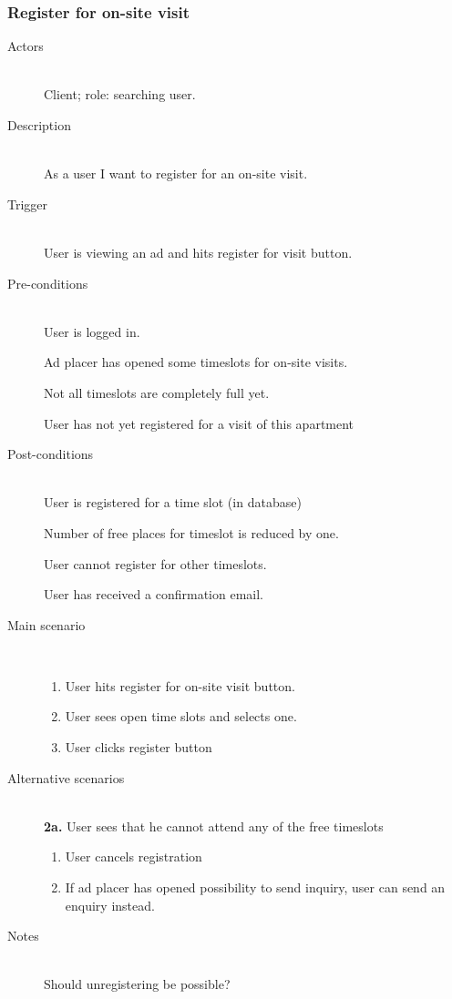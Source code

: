 \documentclass[a4wide]{article}
\begin{document}
\subsubsection{Register for on-site visit}
\begin{description}
\item[Actors]\mbox{}\\
Client; role: searching user.
\item[Description]\mbox{}\\
As a user I want to register for an on-site visit.
\item[Trigger]\mbox{}\\
User is viewing an ad and hits register for visit button.
\item[Pre-conditions]\mbox{}\\
User is logged in.

Ad placer has opened some timeslots for on-site visits.

Not all timeslots are completely full yet.

User has not yet registered for a visit of this apartment
\item[Post-conditions]\mbox{}\\
User is registered for a time slot (in database)

Number of free places for timeslot is reduced by one.

User cannot register for other timeslots.

User has received a confirmation email.

\item[Main scenario]\mbox{}\\
\begin{enumerate}
\item User hits register for on-site visit button.
\item User sees open time slots and selects one.
\item User clicks register button
\end{enumerate}
\item[Alternative scenarios]\mbox{}\\
\textbf{2a.} User sees that he cannot attend any of the free timeslots
\begin{enumerate}
\item User cancels registration 
\item If ad placer has opened possibility to send inquiry, user can send an enquiry instead.
\end{enumerate}
\item[Notes]\mbox{}\\
Should unregistering be possible?
\end{description}
\end{document}
